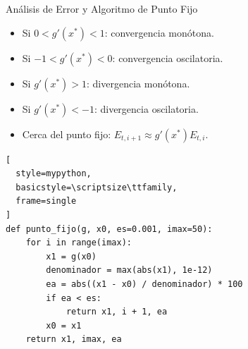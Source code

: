 \documentclass[../../main.tex]{subfiles}
\begin{document}
\begin{frame}[fragile]{Análisis de Error y Algoritmo de Punto Fijo}

\begin{itemize}
  \item Si \(0<g'(x^*)<1\): convergencia monótona.
  \item Si \(-1<g'(x^*)<0\): convergencia oscilatoria.
  \item Si \(g'(x^*)>1\): divergencia monótona.
  \item Si \(g'(x^*)<-1\): divergencia oscilatoria.
  \item Cerca del punto fijo: \(E_{t,i+1}\approx g'(x^*)E_{t,i}.\)
\end{itemize}

\begin{lstlisting}[
  style=mypython,
  basicstyle=\scriptsize\ttfamily,
  frame=single
]
def punto_fijo(g, x0, es=0.001, imax=50):
    for i in range(imax):
        x1 = g(x0)
        denominador = max(abs(x1), 1e-12)
        ea = abs((x1 - x0) / denominador) * 100
        if ea < es:
            return x1, i + 1, ea
        x0 = x1
    return x1, imax, ea
\end{lstlisting}

\end{frame}


\end{document}
